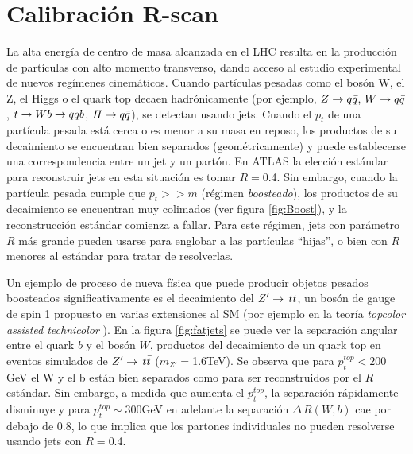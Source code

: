 \chapter{Calibración R-scan}\label{RscanCalib}

La alta energía de centro de masa alcanzada en el LHC resulta en la producción de partículas con alto momento transverso, dando acceso al estudio experimental de nuevos regímenes cinemáticos. Cuando partículas pesadas como el bosón W, el Z, el Higgs o el quark top decaen hadrónicamente (por ejemplo, $Z\rightarrow q\Bar{q}$, $W\rightarrow q\Bar{q}$, $t\rightarrow W b \rightarrow q\Bar{q} b$, $H\rightarrow q\Bar{q}$), se detectan usando jets. Cuando el $p_t$ de una partícula pesada está cerca o es menor a su masa en reposo, los productos de su decaimiento se encuentran bien separados (geométricamente) y puede establecerse una correspondencia entre un jet y un partón. En ATLAS la elección estándar para reconstruir jets en esta situación es tomar $R=$0.4. Sin embargo, cuando la partícula pesada cumple que $p_t>>m$ (régimen \textit{boosteado}), los productos de su decaimiento se encuentran muy colimados (ver figura \ref{fig:Boost}), y la reconstrucción estándar comienza a fallar. Para este régimen, jets con parámetro $R$ más grande pueden usarse para englobar a las partículas ``hijas'', o bien con $R$ menores al estándar para tratar de resolverlas. 

Un ejemplo de proceso de nueva física que puede producir objetos pesados boosteados significativamente es el decaimiento del $Z'\rightarrow\,t\Bar{t}$, un bosón de gauge de spin 1 propuesto en varias extensiones al SM (por ejemplo en la teoría \textit{topcolor assisted technicolor} \cite{Tecnicolor}). En la figura \ref{fig:fatjets} se puede ver la separación angular entre el quark $b$ y el bosón $W$, productos del decaimiento de un quark top en eventos simulados de $Z'\rightarrow\,t\Bar{t}$ ($m_{Z'}=$1.6TeV). Se observa que para $p_t^{top}<200$GeV el W y el b están bien separados como para ser reconstruidos por el $R$ estándar. Sin embargo, a medida que aumenta el $p_t^{top}$, la separación rápidamente disminuye y para $p_t^{top}\sim$300GeV en adelante la separación $\Delta\,R(W,b)$ cae por debajo de 0.8, lo que implica que los partones individuales no pueden resolverse usando jets con $R=$0.4. \\

